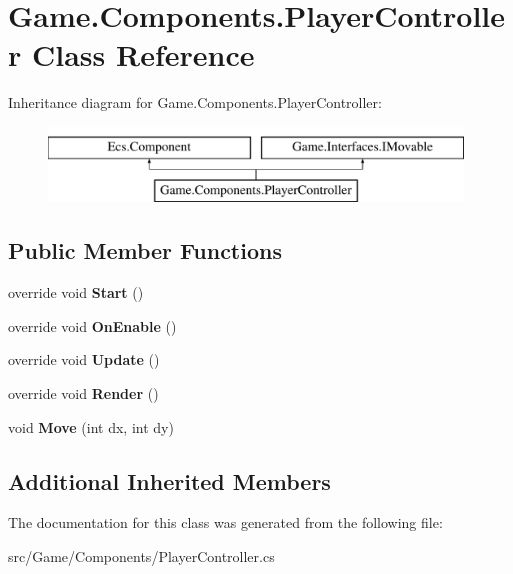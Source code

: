 \hypertarget{class_game_1_1_components_1_1_player_controller}{}\section{Game.\+Components.\+Player\+Controller Class Reference}
\label{class_game_1_1_components_1_1_player_controller}
Inheritance diagram for Game.\+Components.\+Player\+Controller\+:\begin{figure}[H]
\begin{center}
\leavevmode
\includegraphics[height=2.000000cm]{class_game_1_1_components_1_1_player_controller}
\end{center}
\end{figure}
\subsection*{Public Member Functions}
\begin{DoxyCompactItemize}
\item 
\mbox{\label{class_game_1_1_components_1_1_player_controller_ab119c5a22d67c566424afc1e6078821a}} 
override void {\bfseries Start} ()
\item 
\mbox{\label{class_game_1_1_components_1_1_player_controller_ad2c959b663b69b669c274636a813fc80}} 
override void {\bfseries On\+Enable} ()
\item 
\mbox{\label{class_game_1_1_components_1_1_player_controller_aa31b1af2002d8c806ccb39651bb591cd}} 
override void {\bfseries Update} ()
\item 
\mbox{\label{class_game_1_1_components_1_1_player_controller_ae6fe9aee3cee653cfe3385c0049dd044}} 
override void {\bfseries Render} ()
\item 
\mbox{\label{class_game_1_1_components_1_1_player_controller_a1f1bf27d4db033b3fc45022278b8c17e}} 
void {\bfseries Move} (int dx, int dy)
\end{DoxyCompactItemize}
\subsection*{Additional Inherited Members}


The documentation for this class was generated from the following file\+:\begin{DoxyCompactItemize}
\item 
src/\+Game/\+Components/Player\+Controller.\+cs\end{DoxyCompactItemize}
